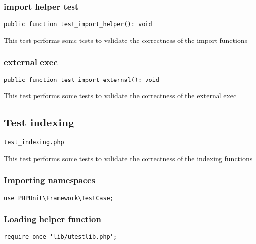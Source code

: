 \documentclass[a4paper]{article}
\begin{document}
\hypertarget{toc237}{}
\subsubsection{import helper test}

\begin{lstlisting}
public function test_import_helper(): void
\end{lstlisting}

This test performs some tests to validate the correctness
of the import functions

\hypertarget{toc238}{}
\subsubsection{external exec}

\begin{lstlisting}
public function test_import_external(): void
\end{lstlisting}

This test performs some tests to validate the correctness
of the external exec

\hypertarget{toc239}{}
\subsection{Test indexing}

\begin{lstlisting}
test_indexing.php
\end{lstlisting}

This test performs some tests to validate the correctness
of the indexing functions

\hypertarget{toc240}{}
\subsubsection{Importing namespaces}

\begin{lstlisting}
use PHPUnit\Framework\TestCase;
\end{lstlisting}

\hypertarget{toc241}{}
\subsubsection{Loading helper function}

\begin{lstlisting}
require_once 'lib/utestlib.php';
\end{lstlisting}
\end{document}
